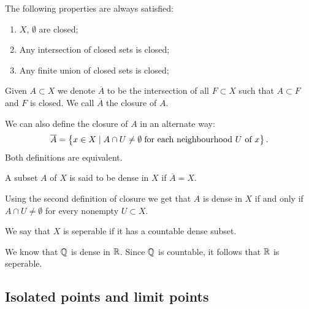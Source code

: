 \documentclass[11pt,a4paper]{article}
\begin{document}
\begin{proposition}
  The following properties are always satisfied:
  \begin{enumerate}
    \item[(1)] $X$, $\emptyset$ are closed;
    \item[(2)] Any intersection of closed sets is closed;
    \item[(3)] Any finite union of closed sets is closed;
  \end{enumerate}
\end{proposition}

\begin{definition}[Closure]
  Given $A \subset X$ we denote $\overline{A}$ to be the intersection of
  all $F \subset X$ such that $A \subset F$ and $F$ is closed. We call
  $\overline{A}$ the closure of $A$.
\end{definition}

\begin{remark}\label{rmk:closure}
  We can also define the closure of $A$ in an alternate way:
  \[
    \overline{A} = \left\{x \in X \mid A \cap U \neq \emptyset \;\text{for each 
    neighbourhood $U$ of $x$}\right\}.
  \]
   Both definitions are equivalent.
\end{remark}

\begin{definition}
  A subset $A$ of $X$ is said to be dense in $X$ if $\overline{A} = X$.
\end{definition}

\begin{remark}
  Using the second definition of closure we get that $A$ is dense in $X$
  if and only if $A \cap U \neq \emptyset$ for every nonempty $U \subset X$.
\end{remark}

\begin{definition}[Seperability]
  We say that $X$ is seperable if it has a countable dense subset.
\end{definition}

\begin{example}
  We know that $\mathbb{Q}$ is dense in $\mathbb{R}$. Since $\mathbb{Q}$ is countable, it follows
  that $\mathbb{R}$ is seperable.
\end{example}

\subsection{Isolated points and limit points}
\end{document}
